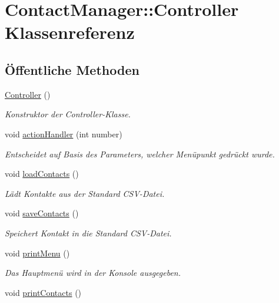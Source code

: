 \hypertarget{classContactManager_1_1Controller}{}\section{Contact\+Manager\+:\+:Controller Klassenreferenz}
\label{classContactManager_1_1Controller}
\subsection*{Öffentliche Methoden}
\begin{DoxyCompactItemize}
\item 
\hyperlink{classContactManager_1_1Controller_a95c56822d667e94b031451729ce069a9}{Controller} ()
\begin{DoxyCompactList}\small\item\em Konstruktor der Controller-\/\+Klasse.\end{DoxyCompactList}\item 
void \hyperlink{classContactManager_1_1Controller_afd2e274df3edef5ab0abf90aae5ad21c}{action\+Handler} (int number)
\begin{DoxyCompactList}\small\item\em Entscheidet auf Basis des Parameters, welcher Menüpunkt gedrückt wurde.\end{DoxyCompactList}\item 
void \hyperlink{classContactManager_1_1Controller_a5b020c2e4726dc2e50fc14b4ac53b3d9}{load\+Contacts} ()
\begin{DoxyCompactList}\small\item\em Lädt Kontakte aus der Standard C\+S\+V-\/\+Datei.\end{DoxyCompactList}\item 
void \hyperlink{classContactManager_1_1Controller_a0d477334b1b20cbc8d7cc899dc69920e}{save\+Contacts} ()
\begin{DoxyCompactList}\small\item\em Speichert Kontakt in die Standard C\+S\+V-\/\+Datei.\end{DoxyCompactList}\item 
void \hyperlink{classContactManager_1_1Controller_ab36756f7c338b7f7d31fe74ad48f059d}{print\+Menu} ()
\begin{DoxyCompactList}\small\item\em Das Hauptmenü wird in der Konsole ausgegeben.\end{DoxyCompactList}\item 
void \hyperlink{classContactManager_1_1Controller_a19404bfe7c87479a58a06296e741473f}{print\+Contacts} ()

\end{DoxyCompactItemize}
